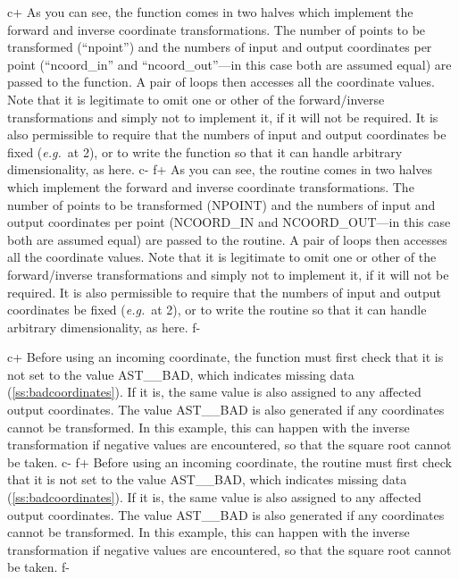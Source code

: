 \documentclass[twoside,11pt]{article}
\newcommand{\secref}[1]{\S\ref{#1}}
\renewcommand{\secref}[1]{\ref{#1}}
\begin{document}
c+
As you can see, the function comes in two halves which implement the
forward and inverse coordinate transformations. The number of points
to be transformed (``npoint'') and the numbers of input and output
coordinates per point (``ncoord\_in'' and ``ncoord\_out''---in this
case both are assumed equal) are passed to the function. A pair of
loops then accesses all the coordinate values.  Note that it is
legitimate to omit one or other of the forward/inverse transformations
and simply not to implement it, if it will not be required. It is also
permissible to require that the numbers of input and output
coordinates be fixed ({\em{e.g.}}\ at 2), or to write the function so
that it can handle arbitrary dimensionality, as here.
c-
f+
As you can see, the routine comes in two halves which implement the
forward and inverse coordinate transformations. The number of points
to be transformed (NPOINT) and the numbers of input and output
coordinates per point (NCOORD\_IN and NCOORD\_OUT---in this case both
are assumed equal) are passed to the routine. A pair of loops then
accesses all the coordinate values.  Note that it is legitimate to
omit one or other of the forward/inverse transformations and simply
not to implement it, if it will not be required. It is also
permissible to require that the numbers of input and output
coordinates be fixed ({\em{e.g.}}\ at 2), or to write the routine so
that it can handle arbitrary dimensionality, as here.
f-

c+
Before using an incoming coordinate, the function must first check
that it is not set to the value AST\_\_BAD, which indicates missing
data (\secref{ss:badcoordinates}). If it is, the same value is also
assigned to any affected output coordinates. The value AST\_\_BAD is
also generated if any coordinates cannot be transformed. In this
example, this can happen with the inverse transformation if negative
values are encountered, so that the square root cannot be taken.
c-
f+
Before using an incoming coordinate, the routine must first check that
it is not set to the value AST\_\_BAD, which indicates missing data
(\secref{ss:badcoordinates}). If it is, the same value is also
assigned to any affected output coordinates. The value AST\_\_BAD is
also generated if any coordinates cannot be transformed. In this
example, this can happen with the inverse transformation if negative
values are encountered, so that the square root cannot be taken.
f-
\end{document}
